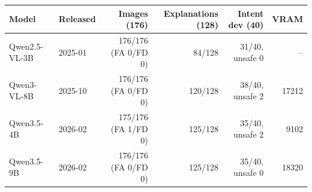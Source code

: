 \begin{tabular}{llrrrr}
\toprule
Model & Released & Images (176) & Explanations (128) & Intent dev (40) & VRAM \\
\midrule
Qwen2.5-VL-3B & 2025-01 & 176/176 (FA 0/FD 0) & 84/128 & 31/40, unsafe 0 & -- \\
Qwen3-VL-8B & 2025-10 & 176/176 (FA 0/FD 0) & 120/128 & 38/40, unsafe 2 & 17212 \\
Qwen3.5-4B & 2026-02 & 175/176 (FA 1/FD 0) & 125/128 & 35/40, unsafe 2 & 9102 \\
Qwen3.5-9B & 2026-02 & 176/176 (FA 0/FD 0) & 125/128 & 35/40, unsafe 0 & 18320 \\
\bottomrule
\end{tabular}
